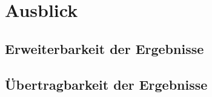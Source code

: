 \documentclass[oneside]{ausarbeitung}
\begin{document}
\section{Ausblick}
\label{sec:ausblick}

\subsection{Erweiterbarkeit der Ergebnisse}
\label{sub:erweiterbarkeit}

\subsection{Übertragbarkeit der Ergebnisse}
\label{sub:uebertragbarkeit}

\appendix

\printbibliography


\end{document}
